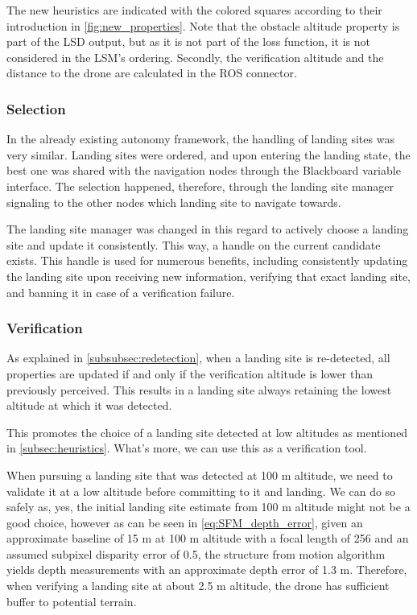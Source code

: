 The new heuristics are indicated with the colored squares according to their introduction in \cref{fig:new_properties}. Note that the obstacle altitude property is part of the LSD output, but as it is not part of the loss function, it is not considered in the LSM's ordering. Secondly, the verification altitude and the distance to the drone are calculated in the ROS connector.

\subsubsection{Selection}

In the already existing autonomy framework, the handling of landing sites was very similar. Landing sites were ordered, and upon entering the landing state, the best one was shared with the navigation nodes through the Blackboard variable interface. The selection happened, therefore, through the landing site manager signaling to the other nodes which landing site to navigate towards.

The landing site manager was changed in this regard to actively choose a landing site and update it consistently. This way, a handle on the current candidate exists. This handle is used for numerous benefits, including consistently updating the landing site upon receiving new information, verifying that exact landing site, and banning it in case of a verification failure. 

\subsubsection{Verification}\label{subsubsec:verification}

As explained in \cref{subsubsec:redetection}, when a landing site is re-detected, all properties are updated if and only if the verification altitude is lower than previously perceived. This results in a landing site always retaining the lowest altitude at which it was detected.

This promotes the choice of a landing site detected at low altitudes as mentioned in \cref{subsec:heuristics}. What's more, we can use this as a verification tool.

When pursuing a landing site that was detected at 100 m altitude, we need to validate it at a low altitude before committing to it and landing. We can do so safely as, yes, the initial landing site estimate from 100 m altitude might not be a good choice, however as can be seen in \cref{eq:SFM_depth_error}, given an approximate baseline of 15 m at 100 m altitude with a focal length of 256 and an assumed subpixel disparity error of 0.5, the structure from motion algorithm yields depth measurements with an approximate depth error of 1.3 m. Therefore, when verifying a landing site at about 2.5 m altitude, the drone has sufficient buffer to potential terrain.

